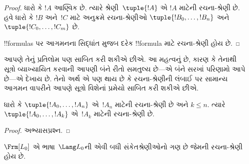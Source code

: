 \documentclass[../../../include/open-logic-section]{subfiles}
\begin{document}
\begin{proof}
ધારો કે $!A$ આણ્વિક છે. ત્યારે શ્રેણી~$\tuple{!A}$ એ $!A$ માટેની
રચના-શ્રેણી છે.
%
હવે ધારો કે $!B$ અને~$!C$ માટે અનુક્રમે રચના-શ્રેણીઓ
$\tuple{!B_0,\dotsc,!B_n}$ અને $\tuple{!C_0,\dotsc,!C_m}$ છે.
%
\begin{enumerate}
\end{enumerate}
!!{formula}s પર આગમનના સિદ્ધાંત મુજબ દરેક !!{formula} માટે
રચના-શ્રેણી હોય છે.
\end{proof}

આપણે તેનું પ્રતિલોમ પણ સાબિત કરી શકીએ છીએ. આ મહત્વનું છે, કારણ કે
તેનાથી સૂત્રો વ્યાખ્યાયિત કરવાની આપણી બંને રીતો સમતુલ્ય છે---એ બંને
સરખાં પરિણામો આપે છે---એ દેખાય છે. તેનો અર્થ એ પણ થાય છે કે
રચના-શ્રેણીની લંબાઈ પર સામાન્ય આગમન વાપરીને આપણે સૂત્રો વિશેનાં
પ્રમેયો સાબિત કરી શકીએ છીએ.

\begin{lem}
ધારો કે $\tuple{!A_0,\dotsc,!A_n}$ એ~$!A_n$ માટેની રચના-શ્રેણી છે
અને $k\leq n$. ત્યારે $\tuple{!A_0,\dotsc,!A_k}$ એ~$!A_k$ માટેની
રચના-શ્રેણી છે.
\end{lem}

\begin{proof}
અભ્યાસપ્રશ્ન.
\end{proof}

\begin{thm}
$\Frm[L_0]$ એ ભાષા~$\Lang L_0$ની એવી બધી સંકેતશ્રેણીઓનો ગણ છે
જેમની રચના-શ્રેણી હોય છે.
\end{thm}
\end{document}
